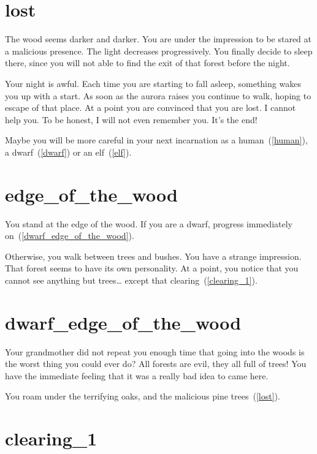 \section{lost}

The wood seems darker and darker. You are under the impression to be stared at a
malicious presence. The light decreases progressively. You finally decide to
sleep there, since you will not able to find the exit of that forest before the
night.

Your night is awful. Each time you are starting to fall asleep, something wakes
you up with a start. As soon as the aurora raises you continue to walk, hoping
to escape of that place. At a point you are convinced that you are lost. I
cannot help you. To be honest, I will not even remember you. It's the end!

\medbreak

Maybe you will be more careful in your next incarnation as a
human~(\ref{human}), a dwarf~(\ref{dwarf}) or an elf~(\ref{elf}).

\section{edge_of_the_wood}

You stand at the edge of the wood. If you are a dwarf, progress immediately
on~(\ref{dwarf_edge_of_the_wood}).

\medbreak

Otherwise, you walk between trees and bushes. You have a strange impression.
That forest seems to have its own personality. At a point, you notice that you
cannot see anything but trees… except that clearing~(\ref{clearing_1}).

\section{dwarf_edge_of_the_wood}

Your grandmother did not repeat you enough time that going into the woods is
the worst thing you could ever do? All forests are evil, they all full of trees!
You have the immediate feeling that it was a really bad idea to came here.

You roam under the terrifying oaks, and the malicious pine trees~(\ref{lost}).

\section{clearing_1}

